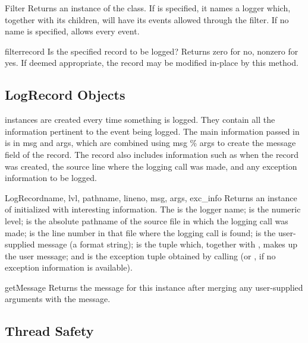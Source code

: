 \begin{classdesc}{Filter}{}
Returns an instance of the  class. If  is specified,
it names a logger which, together with its children, will have its events
allowed through the filter. If no name is specified, allows every event.
\end{classdesc}

\begin{methoddesc}{filter}{record}
Is the specified record to be logged? Returns zero for no, nonzero for
yes. If deemed appropriate, the record may be modified in-place by this
method.
\end{methoddesc}

\subsection{LogRecord Objects}

 instances are created every time something is logged. They
contain all the information pertinent to the event being logged. The
main information passed in is in msg and args, which are combined
using msg \% args to create the message field of the record. The record
also includes information such as when the record was created, the
source line where the logging call was made, and any exception
information to be logged.

\begin{classdesc}{LogRecord}{name, lvl, pathname, lineno, msg, args,
                             exc_info}
Returns an instance of  initialized with interesting
information. The  is the logger name;  is the
numeric level;  is the absolute pathname of the source
file in which the logging call was made;  is the line
number in that file where the logging call is found;  is the
user-supplied message (a format string);  is the tuple
which, together with , makes up the user message; and
 is the exception tuple obtained by calling
(or , if no exception information
is available).
\end{classdesc}

\begin{methoddesc}{getMessage}{}
Returns the message for this  instance after merging any
user-supplied arguments with the message.
\end{methoddesc}

\subsection{Thread Safety}

